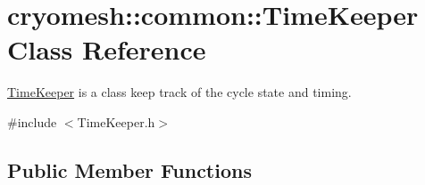 \hypertarget{classcryomesh_1_1common_1_1TimeKeeper}{\section{cryomesh\-:\-:common\-:\-:\-Time\-Keeper \-Class \-Reference}
\label{classcryomesh_1_1common_1_1TimeKeeper}
}


\hyperlink{classcryomesh_1_1common_1_1TimeKeeper}{\-Time\-Keeper} is a class keep track of the cycle state and timing.  




{\ttfamily \#include $<$\-Time\-Keeper.\-h$>$}

\subsection*{\-Public \-Member \-Functions}
